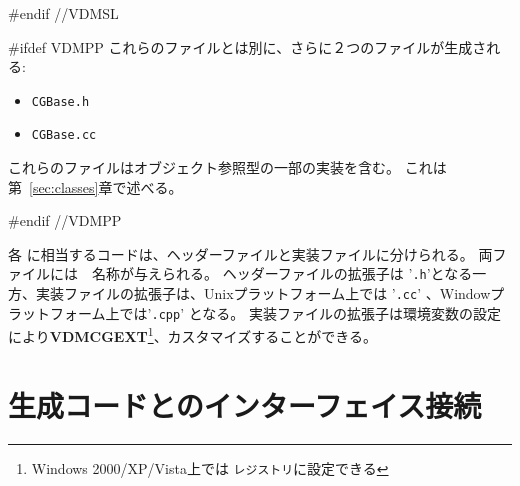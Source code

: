 \documentclass[\pformat,12pt]{jarticle}
\begin{document}
#endif //VDMSL

#ifdef VDMPP
これらのファイルとは別に、さらに２つのファイルが生成される:
\begin{itemize}
\item \texttt{CGBase.h}
\item \texttt{CGBase.cc}
\end{itemize}

これらのファイルはオブジェクト参照型の一部の実装を含む。 
これは第~\ref{sec:classes}章で述べる。

%

#endif //VDMPP

各 \VDM{} に相当するコードは、ヘッダーファイルと実装ファイルに分けられる。
両ファイルには　名称が与えられる。
ヘッダーファイルの拡張子は '\texttt{.h}'となる一方、実装ファイルの拡張子は、Unixプラットフォーム上では '\texttt{.cc}' 、Windowプラットフォーム上では'\texttt{.cpp}' となる。
実装ファイルの拡張子は環境変数の設定により{\bf VDMCGEXT}\footnote{Windows 2000/XP/Vista上では \texttt{レジストリ}に設定できる}、カスタマイズすることができる。

\section{生成コードとのインターフェイス接続}\label{interfacing}
\end{document}
